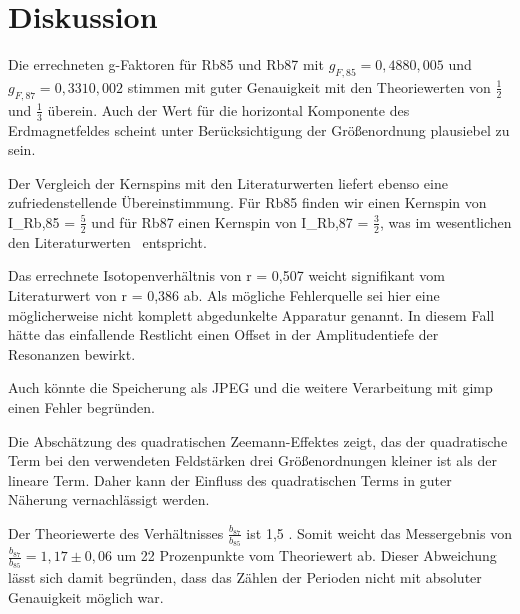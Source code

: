 \section{Diskussion}
Die errechneten g-Faktoren für Rb85 und Rb87 mit $g_{F,85} = 0,488 $\pm$ 0,005$ und
$g_{F,87} = 0,331 $\pm$ 0,002$ stimmen mit guter Genauigkeit mit den Theoriewerten von $\frac{1}{2}$ und $\frac{1}{3}$ überein.
Auch der Wert für die horizontal Komponente des Erdmagnetfeldes scheint unter Berücksichtigung der Größenordnung plausiebel zu sein.

Der Vergleich der Kernspins mit den Literaturwerten liefert ebenso eine zufriedenstellende Übereinstimmung.
Für Rb85 finden wir einen Kernspin von  I_{Rb,85} = $\frac{5}{2}$ und für Rb87 einen Kernspin von I_{Rb,87} = $\frac{3}{2}$, was im wesentlichen den Literaturwerten \cite{coreSpin} entspricht.

Das errechnete Isotopenverhältnis von r = 0,507 weicht signifikant vom Literaturwert von r = 0,386  ab. Als mögliche Fehlerquelle
sei hier eine möglicherweise nicht komplett abgedunkelte Apparatur genannt. In diesem Fall hätte das einfallende Restlicht
einen Offset in der Amplitudentiefe der Resonanzen bewirkt.

Auch könnte die Speicherung als JPEG und die weitere Verarbeitung mit gimp einen Fehler begründen.

Die Abschätzung des quadratischen Zeemann-Effektes zeigt, das der quadratische Term bei den verwendeten Feldstärken drei Größenordnungen kleiner ist als der lineare Term. Daher kann der Einfluss des quadratischen Terms in guter Näherung vernachlässigt werden.

Der Theoriewerte des Verhältnisses $\frac{b_{87}}{b_{85}}$ ist 1,5 \cite{FP}. Somit weicht das Messergebnis von $\frac{b_{87}}{b_{85}} = 1,17 \pm 0,06$ um 22 Prozenpunkte vom Theoriewert ab.
Dieser Abweichung lässt sich damit begründen, dass das Zählen der Perioden nicht mit absoluter Genauigkeit möglich war.

\printbibliography
